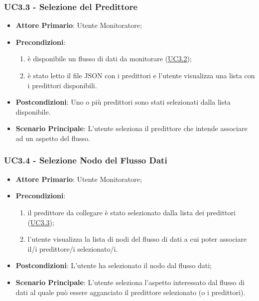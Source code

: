 		\label{par:UC3.3}
		\subsubsection{UC3.3 - Selezione del Predittore}
		\begin{itemize}
			\item\textbf{Attore Primario}: Utente Monitoratore;
			\item\textbf{Precondizioni}: 
				\begin{enumerate}
					\item è disponibile un flusso di dati da monitorare (\hyperref[par:UC3.2]{UC3.2}); 
					\item è stato letto il file JSON con i predittori e l'utente visualizza una lista con i predittori disponibili.
				\end{enumerate}
			\item\textbf{Postcondizioni}: Uno o più predittori sono stati selezionati dalla lista disponibile.
			\item\textbf{Scenario Principale}: L’utente seleziona il predittore che intende associare ad un aspetto del flusso.
		\end{itemize}
	
	\label{par:UC3.4}
	\subsubsection{UC3.4 - Selezione Nodo del Flusso Dati}
		\begin{itemize}
			\item\textbf{Attore Primario}: Utente Monitoratore;
			\item\textbf{Precondizioni}:
				\begin{enumerate}
					\item il predittore da collegare è stato selezionato dalla lista dei predittori (\hyperref[par:UC3.3]{UC3.3});
					\item l’utente visualizza la lista di nodi del flusso di dati a cui poter associare il/i predittore/i selezionato/i.
				\end{enumerate}
			\item\textbf{Postcondizioni}: L'utente ha selezionato il nodo dal flusso dati;
			\item\textbf{Scenario Principale}: L’utente seleziona l’aspetto interessato dal flusso di dati al quale può essere agganciato il predittore selezionato (o i predittori).
		\end{itemize}

	\label{par:UC3.5}
